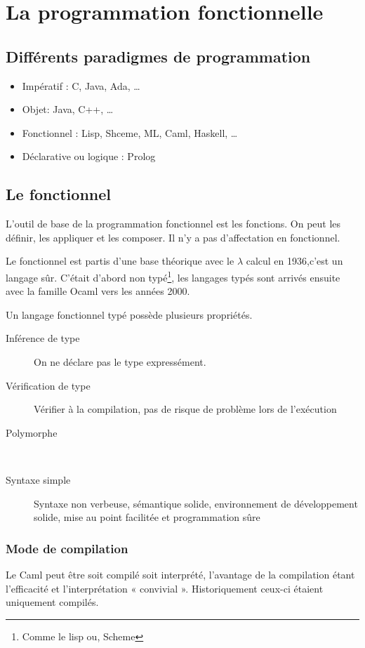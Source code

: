 \chapter{La programmation fonctionnelle}
\section{Différents paradigmes de programmation}
\begin{itemize}
	\item Impératif : C, Java, Ada, \ldots
	\item Objet: Java, C++, \ldots
	\item Fonctionnel : Lisp, Shceme, ML, Caml, Haskell, \ldots
	\item Déclarative ou logique : Prolog
\end{itemize}
\section{Le fonctionnel}
L'outil de base de la programmation fonctionnel est les fonctions. On peut les définir, les appliquer et les composer. Il n'y a pas d'affectation
en fonctionnel.

Le fonctionnel est partis d'une base théorique avec le $\lambda$ calcul en 1936,c'est un langage sûr. C'était d'abord non typé\footnote{Comme le
lisp ou, Scheme}, les langages typés sont arrivés ensuite avec la famille Ocaml vers les années 2000.

Un langage fonctionnel typé possède plusieurs propriétés.
\begin{description}
	\item[Inférence de type] On ne déclare pas le type expressément.
	\item[Vérification de type] Vérifier à la compilation, pas de risque de problème lors de l'exécution
	\item[Polymorphe]~ 
	\item[Syntaxe simple] Syntaxe non verbeuse, sémantique solide, environnement de développement solide, mise au point facilitée et programmation sûre
\end{description}

\subsection{Mode de compilation}
Le Caml peut être soit compilé soit interprété, l'avantage de la compilation étant l'efficacité et l'interprétation « convivial ». Historiquement
ceux-ci étaient uniquement compilés.
